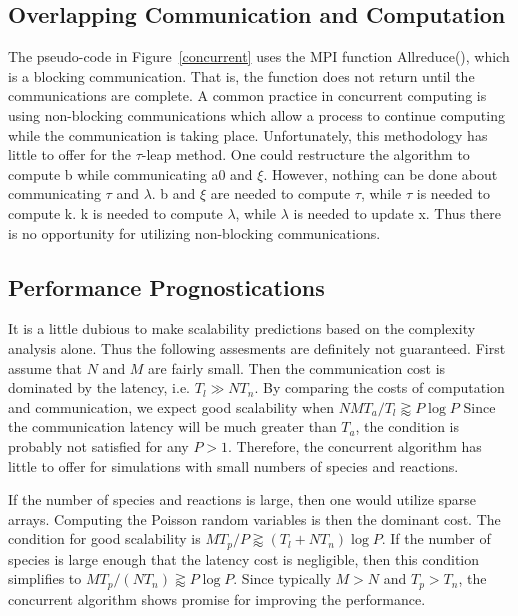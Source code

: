 \documentclass[letterpaper]{article}
\begin{document}
\subsection{Overlapping Communication and Computation}


The pseudo-code in Figure~\ref{concurrent} uses the MPI function 
Allreduce(), which is a blocking communication.  That is, the function 
does not return until the communications are complete.  A common practice
in concurrent computing is using non-blocking communications which allow
a process to continue computing while the communication is taking place.  
Unfortunately, this methodology has little to offer for the $\tau$-leap
method.  One could restructure the algorithm to compute b while 
communicating a0 and $\xi$.  However, nothing can be done about communicating
$\tau$ and $\lambda$.  b and $\xi$ are needed to compute $\tau$, while
$\tau$ is needed to compute k.  k is needed to compute $\lambda$, while 
$\lambda$ is needed to update x.  Thus there is no opportunity for 
utilizing non-blocking communications.





\subsection{Performance Prognostications}


It is a little dubious to make scalability predictions based on the 
complexity analysis alone.  Thus the following assesments are definitely 
not guaranteed.  First assume that $N$ and $M$ are fairly small.  
Then the communication
cost is dominated by the latency, i.e. $T_l \gg N T_n$.  By comparing
the costs of computation and communication, we expect good scalability
when $N M T_a / T_l \gtrapprox P \log P$  Since the communication latency will 
be much greater than $T_a$, the condition is probably not satisfied for any
$P > 1$.  Therefore, the concurrent algorithm has little to offer for 
simulations with small numbers of species and reactions.


If the number of species and reactions is large, then one would utilize 
sparse arrays.  Computing the Poisson random variables is then the dominant
cost.  The condition for good scalability is
$M T_p / P \gtrapprox (T_l + N T_n) \log P$. 
If the number of species is large enough that the latency cost is 
negligible, then this condition simplifies to
$M T_p / (N T_n) \gtrapprox P \log P$.  
Since typically $M > N$ and $T_p > T_n$, 
the concurrent algorithm shows promise for improving the performance.  
\end{document}
